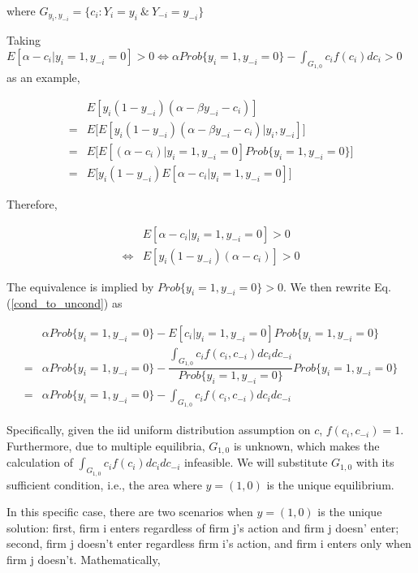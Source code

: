 \documentclass[draft]{article}
\begin{document}
where $G_{y_i, y_{-i}} = \{c_i:  Y_i = y_i \ \& \ Y_{-i} = y_{-i}\}$


Taking $E[\alpha  - c_i | y_i = 1, y_{-i} = 0] > 0 \Longleftrightarrow \alpha Prob\{y_i = 1, y_{-i} = 0\} - \int_{G_{1,0}}c_if(c_i)dc_i > 0$ as an example,


$$
\begin{array}{rl}
&E[y_i(1 - y_{-i})(\alpha  - \beta y_{-i} - c_i)] \\
=&E\big[E[y_i(1 - y_{-i})(\alpha  - \beta y_{-i} - c_i)| y_i, y_{-i}] \big]\\
=&E\big[E[(\alpha - c_i)| y_i = 1, y_{-i} = 0] Prob\{ y_i = 1, y_{-i} = 0\} \big]\\
=&E\big[y_i(1 - y_{-i})E[\alpha - c_i | y_i = 1, y_{-i} = 0] \big]
\end{array}
$$

Therefore,

\begin{equation}
 \begin{array}{cl}
     &E[\alpha - c_i | y_i = 1, y_{-i} = 0] > 0\\
    \Longleftrightarrow&E[y_i(1 - y_{-i})(\alpha - c_i )] > 0 
\end{array}
\label{cond_to_uncond}
\end{equation}

The equivalence is implied by $Prob\{y_i = 1, y_{-i} = 0\} > 0$. We then rewrite Eq.(\ref{cond_to_uncond}) as

$$
\begin{array}{cl}
      &\alpha Prob\{y_i = 1, y_{-i} = 0\} - E[c_i|y_i = 1, y_{-i} = 0]Prob\{y_i = 1, y_{-i} = 0\}\\
    =& \alpha Prob\{y_i = 1, y_{-i} = 0\} - \dfrac{\int_{G_{1,0}}c_if(c_i, c_{-i})dc_idc_{-i}}{Prob\{y_i = 1, y_{-i} = 0\}} Prob\{y_i = 1, y_{-i} = 0\}\\
    =& \alpha Prob\{y_i = 1, y_{-i} = 0\} - \int_{G_{1,0}}c_if(c_i, c_{-i})dc_idc_{-i}
\end{array}
$$

Specifically, given the iid uniform distribution assumption on $c$, $f(c_i, c_{-i}) = 1$. Furthermore, due to multiple equilibria, $G_{1,0}$ is unknown, which makes the calculation of $\int_{G_{1,0}}c_if(c_i)dc_idc_{-i}$ infeasible.  We will substitute $G_{1,0}$ with its sufficient condition, i.e., the area where $y=(1, 0)$ is the unique equilibrium. 

In this specific case, there are two scenarios when $y = (1, 0)$ is the unique solution: first, firm i enters regardless of firm j's action and firm j doesn' enter; second, firm j doesn't enter regardless firm i's action, and firm i enters only when  firm j doesn't. Mathematically,
\end{document}
